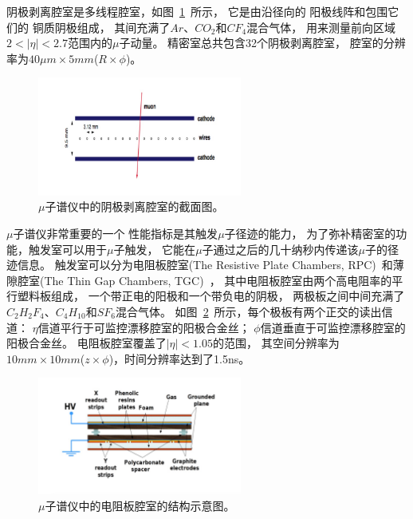 阴极剥离腔室是多线程腔室，如图~\ref{fig:ATLASMS2}~所示，
它是由沿径向的
阳极线阵和包围它们的
铜质阴极组成，
其间充满了$Ar$、$CO_2$和$CF_4$混合气体，
用来测量前向区域$2<|\eta|<2.7$范围内的$\mu$子动量。
精密室总共包含32个阴极剥离腔室，
腔室的分辨率为$40\mu m\times5mm$($R\times\phi$)。

\begin{figure}
  \begin{center}
    \includegraphics[width=0.6\textwidth]{figuresEXP/ATLASMS2.jpg}
  \end{center}
  \caption{
$\mu$子谱仪中的阴极剥离腔室的截面图。
  }
    \label{fig:ATLASMS2}
\end{figure}

$\mu$子谱仪非常重要的一个
性能指标是其触发$\mu$子径迹的能力，
为了弥补精密室的功能，触发室可以用于$\mu$子触发，
它能在$\mu$子通过之后的几十纳秒内传递该$\mu$子的径迹信息。
触发室可以分为电阻板腔室(The Resistive Plate Chambers, RPC)~\cite{ATLASRPC}和薄隙腔室(The Thin Gap Chambers, TGC)~\cite{ATLASTGC}，
其中电阻板腔室由两个高电阻率的平行塑料板组成，
一个带正电的阳极和一个带负电的阴极，
两极板之间中间充满了$C_2H_2F_4$、$C_4H_{10}$和$SF_6$混合气体。
如图~\ref{fig:ATLASMS3}~所示，每个极板有两个正交的读出信道：
$\eta$信道平行于可监控漂移腔室的阳极合金丝；
$\phi$信道垂直于可监控漂移腔室的阳极合金丝。
电阻板腔室覆盖了$|\eta|<1.05$的范围，
其空间分辨率为$10mm\times10mm$($z\times\phi$)，时间分辨率达到了1.5ns。

\begin{figure}
  \begin{center}
    \includegraphics[width=0.6\textwidth]{figuresEXP/ATLASMS3.jpg}
  \end{center}
  \caption{
  $\mu$子谱仪中的电阻板腔室的结构示意图。
  }
    \label{fig:ATLASMS3}
\end{figure}

